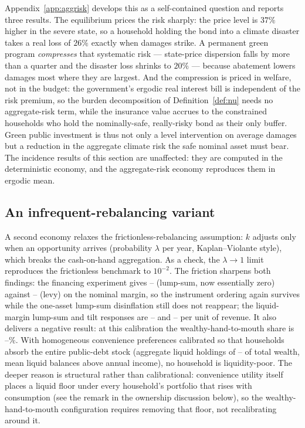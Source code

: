 \documentclass[12pt]{article}
\providecommand{\pendingnum}{\textit{--}}
\providecommand{\TwoBOmega}{\pendingnum}\providecommand{\TwoBWhtm}{\pendingnum}
\providecommand{\TwoBDlnPLS}{\pendingnum}\providecommand{\TwoBDlnPLevy}{\pendingnum}
\providecommand{\TwoBEpsLs}{\pendingnum}\providecommand{\TwoBEpsTilt}{\pendingnum}
\begin{document}
Appendix~\ref{app:aggrisk} develops this as a self-contained question and
reports three results. The equilibrium prices the risk sharply: the price
level is $37\%$ higher in the severe state, so a household holding the bond
into a climate disaster takes a real loss of $26\%$ exactly when damages
strike. A permanent green program \emph{compresses} that systematic risk ---
state-price dispersion falls by more than a quarter and the disaster loss
shrinks to $20\%$ --- because abatement lowers damages most where they are
largest. And the compression is priced in welfare, not in the budget: the
government's ergodic real interest bill is independent of the risk premium,
so the burden decomposition of Definition~\ref{def:nu} needs no
aggregate-risk term, while the insurance value accrues to the constrained
households who hold the nominally-safe, really-risky bond as their only
buffer. Green public investment is thus not only a level intervention on
average damages but a reduction in the aggregate climate risk the safe
nominal asset must bear. The incidence results of this section are
unaffected: they are computed in the deterministic economy, and the
aggregate-risk economy reproduces them in ergodic mean.


\subsection{An infrequent-rebalancing variant}
\noindent A second economy relaxes the frictionless-rebalancing assumption:
$k$ adjusts only when an opportunity arrives (probability $\lambda$ per
year, Kaplan--Violante style), which breaks the cash-on-hand aggregation.
As a check, the $\lambda\to1$ limit
reproduces the frictionless benchmark to $10^{-2}$. The friction sharpens
both findings: the financing experiment gives $\TwoBDlnPLS$ (lump-sum, now
essentially zero) against $\TwoBDlnPLevy$ (levy) on the nominal margin,
so the instrument ordering again survives while the one-asset lump-sum
disinflation still does not reappear; the liquid-margin lump-sum and tilt
responses are
$\TwoBEpsLs$ and $\TwoBEpsTilt$ per unit of revenue. It also delivers a
negative result: at this calibration the
wealthy-hand-to-mouth share is $\TwoBWhtm\%$. With homogeneous
convenience preferences calibrated so that households absorb the entire
public-debt stock (aggregate liquid holdings of $\TwoBOmega$ of total
wealth, mean liquid balances above annual income), no household is
liquidity-poor. The deeper reason is structural rather than
calibrational: convenience utility itself places a liquid floor under
every household's portfolio that rises with consumption (see the remark
in the ownership discussion below), so the wealthy-hand-to-mouth
configuration requires removing that floor, not recalibrating around it.
\end{document}
